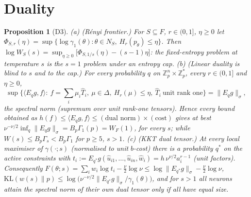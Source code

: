 \documentclass[11pt]{article}
\newtheorem{proposition}{Proposition}[section]\newtheorem{lemma}[proposition]{Lemma}\newtheorem{corollary}[proposition]{Corollary}
\theoremstyle{remark}\newtheorem{remark}[proposition]{Remark}
\newcommand{\KL}{\mathrm{KL}}\newcommand{\cm}{\mathrm{cm}}
\begin{document}
\section{Duality}
\begin{proposition}[D3]\label{p:dual}
(a) (Rényi frontier.) For $S\subseteq F$, $r\in(0,1]$, $\eta\ge0$ let $\Phi_{S,r}(\eta)=\sup\{\log\gamma_1(\theta):\theta\in N_S,\ H_r(p_\theta)\le\eta\}$. Then
$\log W_S(s)=\sup_{\eta\ge0}\big[\Phi_{S,1/s}(\eta)-(s-1)\eta\big]$: the fixed-entropy problem at temperature $s$ is the $s=1$ problem under an entropy cap.
(b) (Linear duality is blind to $s$ and to the cap.) For every probability $q$ on $\mathbb Z_p^n\times\mathbb Z_p^*$, every $r\in(0,1]$ and $\eta\ge0$,
\[\sup\Big\{\langle E_qg,f\rangle:\ f=\sum_i\mu_i\hat T_i,\ \mu\in\Delta,\ H_r(\mu)\le\eta,\ \hat T_i\ \text{unit rank one}\Big\}=\|E_qg\|_\sigma ,\]
the spectral norm (supremum over unit rank-one tensors). Hence every bound obtained as $h(f)\le\langle E_qg,f\rangle\le(\text{dual norm})\times(\text{cost})$
gives at best $\nu^{-\nu/2}\inf_q\|E_qg\|_\sigma=B_p\Gamma_1(p)=W_F(1)$, for every $s$; while $W(s)\le B_p\Gamma_s<B_p\Gamma_1$ for $p\ge5$, $s>1$.
(c) (KKT dual tensor.) At every local maximiser of $\gamma(\cdot;s)$ (normalised to unit $b$-cost) there is a probability $q^*$ on the active
constraints with $t_i:=E_{q^*}g(\hat u_{i1},\dots,\hat u_{in},\hat w_i)=h\,\nu^{\nu/2}a_i^{r-1}$ (unit factors). Consequently
$F(\theta;s)=\sum_iw_i\log t_i-\tfrac\nu2\log\nu\le\log\|E_{q^*}g\|_\sigma-\tfrac\nu2\log\nu$, $\KL(w(s)\|p)\le\log\big(\nu^{-\nu/2}\|E_{q^*}g\|_\sigma/\gamma_1(\theta)\big)$,
and for $s>1$ all neurons attain the spectral norm of their own dual tensor only if all have equal size.
\end{proposition}
\end{document}
